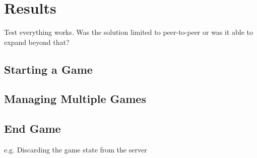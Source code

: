\chapter{Results}
\label{chapter3}
Test everything works.
Was the solution limited to peer-to-peer or was it able to expand beyond that?

\section{Starting a Game}

\section{Managing Multiple Games}

\section{End Game}
e.g. Discarding the game state from the server
